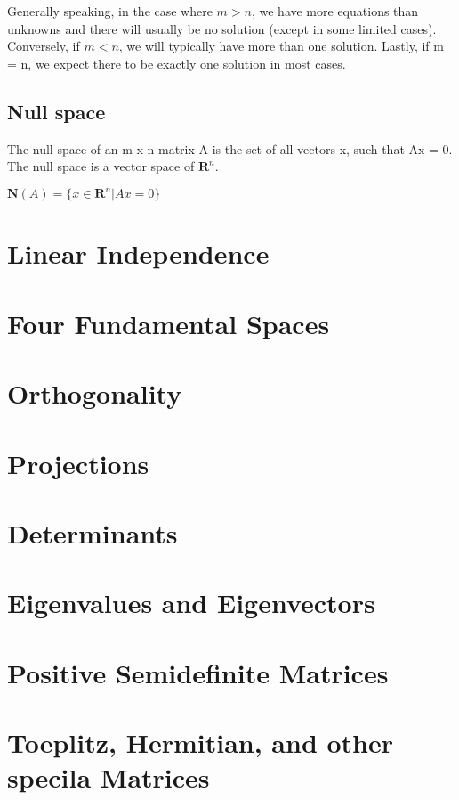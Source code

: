 \documentclass{article}
\begin{document}
Generally speaking, in the case where $m > n$, we have more equations than unknowns and there will usually be no solution (except in some limited cases). Conversely, if $m < n$, we will typically have more than one solution. Lastly, if m = n, we expect there to be exactly one solution in most cases. 

\subsection{Null space}
The null space of an m x n matrix A is the set of all vectors x, such that Ax = 0. The null space is a vector space of $\textbf{R}^n$.

$\textbf{N}(A) = \{x \in \textbf{R}^n | Ax = 0\}$

\section{Linear Independence}

\section{Four Fundamental Spaces}

\section{Orthogonality}

\section{Projections}

\section{Determinants}

\section{Eigenvalues and Eigenvectors}

\section{Positive Semidefinite Matrices}

\section{Toeplitz, Hermitian, and other specila Matrices}
\end{document}
